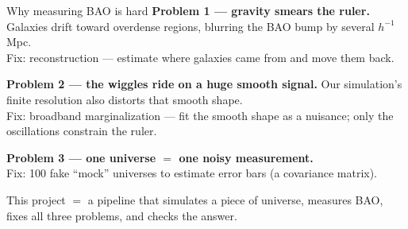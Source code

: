 \documentclass[aspectratio=169,11pt]{beamer}
\begin{document}
\begin{frame}{Why measuring BAO is hard}
  \small
  \textbf{Problem 1 --- gravity smears the ruler.}
  Galaxies drift toward overdense regions, blurring the BAO bump
  by several $h^{-1}$Mpc. \\
  \alert{Fix: reconstruction} --- estimate where galaxies came
  from and move them back.

  \smallskip
  \textbf{Problem 2 --- the wiggles ride on a huge smooth signal.}
  Our simulation's finite resolution also distorts that smooth
  shape. \\
  \alert{Fix: broadband marginalization} --- fit the smooth shape
  as a nuisance; only the oscillations constrain the ruler.

  \smallskip
  \textbf{Problem 3 --- one universe $=$ one noisy measurement.} \\
  \alert{Fix: 100 fake ``mock'' universes} to estimate error bars
  (a covariance matrix).

  \smallskip
  \begin{center}
  \footnotesize
  This project $=$ a pipeline that simulates a piece of universe,
  measures BAO, fixes all three problems, and checks the answer.
  \end{center}
\end{frame}
\end{document}
